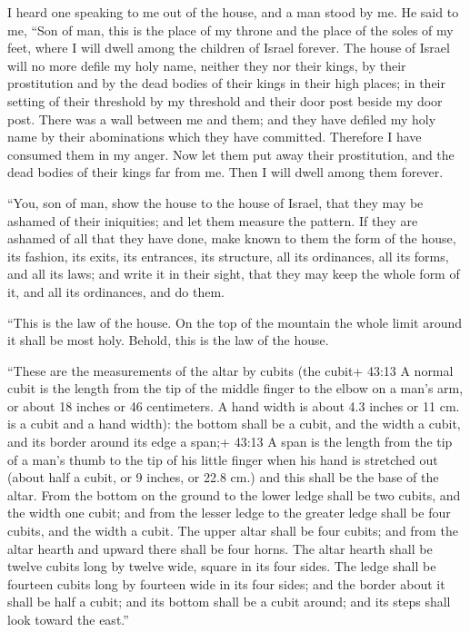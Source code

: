  I heard one speaking to me out of the house, and a man
stood by me.  He said to me, ``Son of man, this is the place
of my throne and the place of the soles of my feet, where I will dwell
among the children of Israel forever. The house of Israel will no more
defile my holy name, neither they nor their kings, by their prostitution
and by the dead bodies of their kings in their high places; 
in their setting of their threshold by my threshold and their door post
beside my door post. There was a wall between me and them; and they have
defiled my holy name by their abominations which they have committed.
Therefore I have consumed them in my anger.  Now let them
put away their prostitution, and the dead bodies of their kings far from
me. Then I will dwell among them forever.

 ``You, son of man, show the house to the house of Israel,
that they may be ashamed of their iniquities; and let them measure the
pattern.  If they are ashamed of all that they have done,
make known to them the form of the house, its fashion, its exits, its
entrances, its structure, all its ordinances, all its forms, and all its
laws; and write it in their sight, that they may keep the whole form of
it, and all its ordinances, and do them.

 ``This is the law of the house. On the top of the mountain
the whole limit around it shall be most holy. Behold, this is the law of
the house.

 ``These are the measurements of the altar by cubits (the
cubit+ 43:13 A normal cubit is the length from the tip of the middle
finger to the elbow on a man's arm, or about 18 inches or 46
centimeters. A hand width is about 4.3 inches or 11 cm. is a cubit and a
hand width): the bottom shall be a cubit, and the width a cubit, and its
border around its edge a span;+ 43:13 A span is the length from the tip
of a man's thumb to the tip of his little finger when his hand is
stretched out (about half a cubit, or 9 inches, or 22.8 cm.) and this
shall be the base of the altar.  From the bottom on the
ground to the lower ledge shall be two cubits, and the width one cubit;
and from the lesser ledge to the greater ledge shall be four cubits, and
the width a cubit.  The upper altar shall be four cubits;
and from the altar hearth and upward there shall be four horns.
 The altar hearth shall be twelve cubits long by twelve
wide, square in its four sides.  The ledge shall be
fourteen cubits long by fourteen wide in its four sides; and the border
about it shall be half a cubit; and its bottom shall be a cubit around;
and its steps shall look toward the east.''


